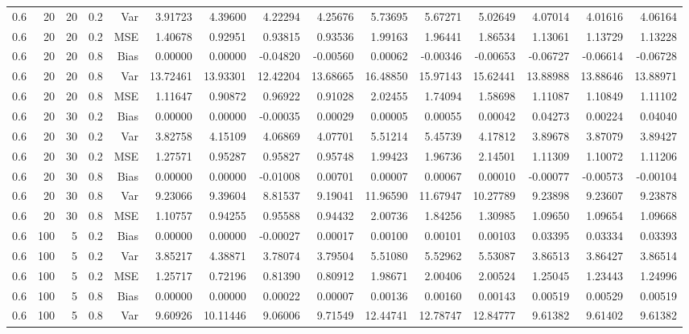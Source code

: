 \begin{table}[!htbp]
\begin{tabular}{lrrrrrrrrrrrrrr}
0.6 &  20 & 20 & 0.2 & Var & 3.91723 & 4.39600 & 4.22294 & 4.25676 & 5.73695 & 5.67271 & 5.02649 & 4.07014 & 4.01616 & 4.06164 \\
0.6 &  20 & 20 & 0.2 & MSE & 1.40678 & 0.92951 & 0.93815 & 0.93536 & 1.99163 & 1.96441 & 1.86534 & 1.13061 & 1.13729 & 1.13228 \\
0.6 &  20 & 20 & 0.8 & Bias & 0.00000 & 0.00000 & -0.04820 & -0.00560 & 0.00062 & -0.00346 & -0.00653 & -0.06727 & -0.06614 & -0.06728 \\
0.6 &  20 & 20 & 0.8 & Var & 13.72461 & 13.93301 & 12.42204 & 13.68665 & 16.48850 & 15.97143 & 15.62441 & 13.88988 & 13.88646 & 13.88971 \\
0.6 &  20 & 20 & 0.8 & MSE & 1.11647 & 0.90872 & 0.96922 & 0.91028 & 2.02455 & 1.74094 & 1.58698 & 1.11087 & 1.10849 & 1.11102 \\
0.6 &  20 & 30 & 0.2 & Bias & 0.00000 & 0.00000 & -0.00035 & 0.00029 & 0.00005 & 0.00055 & 0.00042 & 0.04273 & 0.00224 & 0.04040 \\
0.6 &  20 & 30 & 0.2 & Var & 3.82758 & 4.15109 & 4.06869 & 4.07701 & 5.51214 & 5.45739 & 4.17812 & 3.89678 & 3.87079 & 3.89427 \\
0.6 &  20 & 30 & 0.2 & MSE & 1.27571 & 0.95287 & 0.95827 & 0.95748 & 1.99423 & 1.96736 & 2.14501 & 1.11309 & 1.10072 & 1.11206 \\
0.6 &  20 & 30 & 0.8 & Bias & 0.00000 & 0.00000 & -0.01008 & 0.00701 & 0.00007 & 0.00067 & 0.00010 & -0.00077 & -0.00573 & -0.00104 \\
0.6 &  20 & 30 & 0.8 & Var & 9.23066 & 9.39604 & 8.81537 & 9.19041 & 11.96590 & 11.67947 & 10.27789 & 9.23898 & 9.23607 & 9.23878 \\
0.6 &  20 & 30 & 0.8 & MSE & 1.10757 & 0.94255 & 0.95588 & 0.94432 & 2.00736 & 1.84256 & 1.30985 & 1.09650 & 1.09654 & 1.09668 \\
0.6 & 100 &  5 & 0.2 & Bias & 0.00000 & 0.00000 & -0.00027 & 0.00017 & 0.00100 & 0.00101 & 0.00103 & 0.03395 & 0.03334 & 0.03393 \\
0.6 & 100 &  5 & 0.2 & Var & 3.85217 & 4.38871 & 3.78074 & 3.79504 & 5.51080 & 5.52962 & 5.53087 & 3.86513 & 3.86427 & 3.86514 \\
0.6 & 100 &  5 & 0.2 & MSE & 1.25717 & 0.72196 & 0.81390 & 0.80912 & 1.98671 & 2.00406 & 2.00524 & 1.25045 & 1.23443 & 1.24996 \\
0.6 & 100 &  5 & 0.8 & Bias & 0.00000 & 0.00000 & 0.00022 & 0.00007 & 0.00136 & 0.00160 & 0.00143 & 0.00519 & 0.00529 & 0.00519 \\
0.6 & 100 &  5 & 0.8 & Var & 9.60926 & 10.11446 & 9.06006 & 9.71549 & 12.44741 & 12.78747 & 12.84777 & 9.61382 & 9.61402 & 9.61382 \\

\end{tabular}
\end{table}
